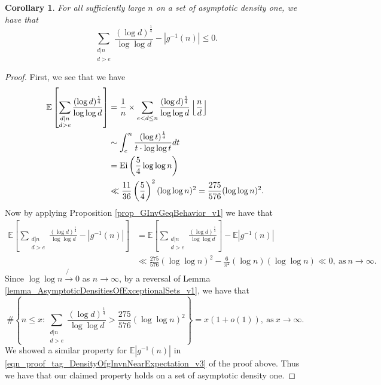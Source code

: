 \documentclass[11pt,reqno,a4letter]{article}
\numberwithin{figure}{section}
\numberwithin{table}{section}
\newcommand{\Floor}[2]{\ensuremath{\left\lfloor \frac{#1}{#2} \right\rfloor}}
\theoremstyle{plain}
\newtheorem{cor}[theorem]{Corollary}
\numberwithin{theorem}{section}
\theoremstyle{definition}
\begin{document}
\begin{cor} 
\label{cor_GInvGeqBehavior_v2} 
For all sufficiently large $n$ on a set of asymptotic density one, we have that 
\[
\sum_{\substack{d|n \\ d > e}} \frac{(\log d)^{\frac{1}{4}}}{\log\log d} - |g^{-1}(n)| \leq 0. 
\]
\end{cor} 
\begin{proof} 
First, we see that we have 
\begin{align} 
\notag 
\mathbb{E}\left[\sum_{\substack{d|n \\ d > e}} \frac{(\log d)^{\frac{1}{4}}}{\log\log d}\right] & = 
     \frac{1}{n} \times \sum_{e < d \leq n} \frac{(\log d)^{\frac{1}{4}}}{\log\log d} \Floor{n}{d} \\ 
\notag 
     & \sim \int_{e}^{n} \frac{(\log t)^{\frac{1}{4}}}{t \cdot \log\log t} dt \\ 
\notag 
     & = \operatorname{Ei}\left(\frac{5}{4} \log\log n\right) \\ 
\label{eqn_proof_tag_EKeyDivSum_v1} 
     & \ll \frac{11}{36} \left(\frac{5}{4}\right)^2 (\log\log n)^2 = \frac{275}{576} (\log\log n)^2. 
\end{align} 
Now by applying 
Proposition \ref{prop_GInvGeqBehavior_v1} we have that 
\begin{align*} 
\mathbb{E}\left[\sum_{\substack{d|n \\ d > e}} \frac{(\log d)^{\frac{1}{4}}}{\log\log d} - |g^{-1}(n)|\right] & = 
     \mathbb{E}\left[\sum_{\substack{d|n \\ d > e}} \frac{(\log d)^{\frac{1}{4}}}{\log\log d}\right] - 
     \mathbb{E}|g^{-1}(n)| \\ 
     & \ll 
     \frac{275}{576} (\log\log n)^2 - \frac{6}{\pi^2} (\log n) (\log\log n) \ll 0, 
     \mathrm{\ as\ } n \rightarrow \infty. 
\end{align*} 
Since $\log\log n \not{\rightarrow} 0$ as $n \rightarrow \infty$, by a reversal of 
Lemma \ref{lemma_AsymptoticDensitiesOfExceptionalSets_v1}, we have that 
\[
\#\left\{n \leq x: \sum_{\substack{d|n \\ d > e}} \frac{(\log d)^{\frac{1}{4}}}{\log\log d} > 
     \frac{275}{576} (\log\log n)^2\right\} = x(1+o(1)), \mathrm{\ as\ } x \rightarrow \infty. 
\]
We showed a similar property for $\mathbb{E}|g^{-1}(n)|$ in 
\eqref{eqn_proof_tag_DensityOfgInvnNearExpectation_v3} of the proof above. 
Thus we have that our claimed property holds on a set of asymptotic density one. 
\end{proof} 
\end{document}
